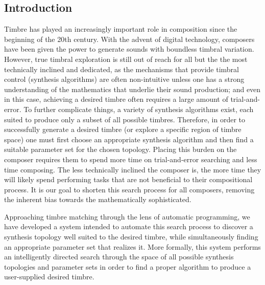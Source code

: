 \documentclass[a4paper,12pt]{report} 	%
\numberwithin{figure}{chapter}
\numberwithin{table}{chapter}
\numberwithin{equation}{chapter}
\begin{document}
\begin{flushleft}				%
\setlength{\parindent}{30pt}	%

				
\vspace*{\QuarterPage}
\newpage
{}
\chapter{Introduction} %
Timbre has played an increasingly important role in composition since the beginning of the 20th century. With the advent of digital technology, composers have been given the power to generate sounds with boundless timbral variation. However, true timbral exploration is still out of reach for all but the the most technically inclined and dedicated, as the mechanisms that provide timbral control (synthesis algorithms) are often non-intuitive unless one has a strong understanding of the mathematics that underlie their sound production; and even in this case, achieving a desired timbre often requires a large amount of trial-and-error. To further complicate things, a variety of synthesis algorithms exist, each suited to produce only a subset of all possible timbres. Therefore, in order to successfully generate a desired timbre (or explore a specific region of timbre space) one must first choose an appropriate synthesis algorithm and then find a suitable parameter set for the chosen topology. Placing this burden on the composer requires them to spend more time on trial-and-error searching and less time composing. The less technically inclined the composer is, the more time they will likely spend performing tasks that are not beneficial to their compositional process. It is our goal to shorten this search process for all composers, removing the inherent bias towards the mathematically sophisticated.

Approaching timbre matching through the lens of automatic programming, we have developed a system intended to automate this search process to discover a synthesis topology well suited to the desired timbre, while simultaneously finding an appropriate parameter set that realizes it. More formally, this system performs an intelligently directed search through the space of all possible synthesis topologies and parameter sets in order to find a proper algorithm to produce a user-supplied desired timbre.


\end{flushleft}
\end{document}
